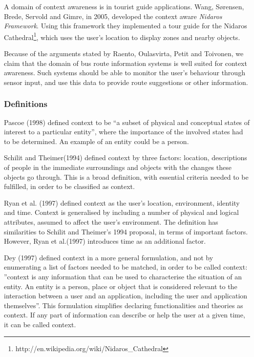 A domain of context awareness is in tourist guide applications. Wang, S\o rensen, Brede, Servold and Gimre, in 2005, developed the context aware \emph{Nidaros Framework}\cite{wang}. Using this framework they implemented a tour guide for the Nidaros Cathedral\footnote{http://en.wikipedia.org/wiki/Nidaros\_Cathedral}, which uses the user's location to display zones and nearby objects.

Because of the arguments stated by Raento, Oulasvirta, Petit and Toivonen, we claim that the domain of bus route information systems is well suited for context awareness. Such systems should be able to monitor the user's behaviour through sensor input, and use this data to provide route suggestions or other information.

\subsubsection{Definitions}
Pascoe (1998) defined context to be ``a subset of physical and conceptual states of interest to a particular entity''\cite{Pascoe}, where the importance of the involved states had to be determined. An example of an entity could be a person.

Schilit and Theimer(1994)  defined context by three factors: location, descriptions of people in the immediate surroundings and objects with the changes these objects go through\cite{Schilit}. This is a broad definition, with essential criteria needed to be fulfilled, in order to be classified as context.

Ryan et al. (1997)  defined context as the user's location, environment, identity and time\cite{Ryan}. Context is generalised by including a number of physical and logical attributes, assumed to affect the user's environment. The definition has similarities to Schilit and Theimer's 1994 proposal, in terms of important factors. However, Ryan et al.(1997) introduces time as an additional factor.

Dey (1997) defined context in a more general formulation, and not by enumerating a list of factors needed to be matched, in order to be called context: ''context is any information that can be used to characterise the situation of an entity. An entity is a person, place or object that is considered relevant to the interaction between a user and an application, including the user and application themselves''\cite{Dey}. This formulation simplifies declaring functionalities and theories as context. If any part of information can describe or help the user at a given time, it can be called context.

